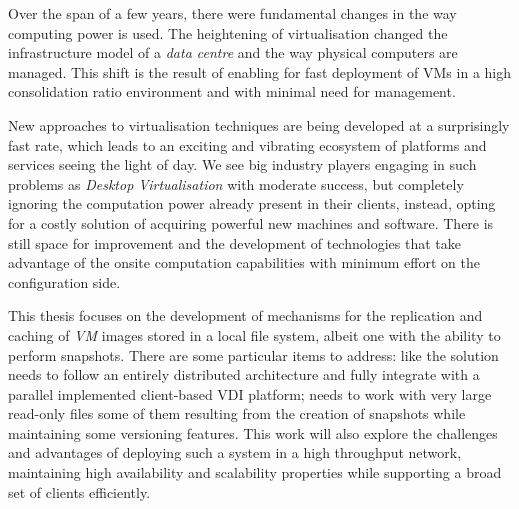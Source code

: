 
Over the span of a few years, there were fundamental changes in the way computing power is used. The heightening of virtualisation changed the infrastructure model of a \textit{data centre} and the way physical computers are managed. This shift is the result of enabling for fast deployment of \glspl{VM} in a high consolidation ratio environment and with minimal need for management.

New approaches to virtualisation techniques are being developed at a surprisingly fast rate, which leads to an exciting and vibrating ecosystem of platforms and services seeing the light of day. We see big industry players engaging in such problems as \textit{Desktop Virtualisation} with moderate success, but completely ignoring the computation power already present in their clients, instead, opting for a costly solution of acquiring powerful new machines and software. There is still space for improvement and the development of technologies that take advantage of the onsite computation capabilities with minimum effort on the configuration side.

This thesis focuses on the development of mechanisms for the replication and caching of \textit{VM} images stored in a local file system, albeit one with the ability to perform snapshots. There are some particular items to address: like the solution needs to follow an entirely distributed architecture and fully integrate with a parallel implemented client-based \gls{VDI} platform; needs to work with very large read-only files some of them resulting from the creation of snapshots while maintaining some versioning features. This work will also explore the challenges and advantages of deploying such a system in a high throughput network, maintaining high availability and scalability properties while supporting a broad set of clients efficiently. 


